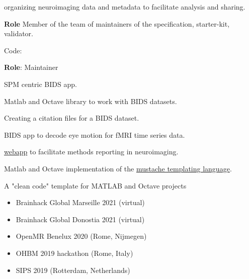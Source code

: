 
 organizing neuroimaging data and metadata to facilitate analysis and sharing.

\textbf{Role} Member of the team of maintainers of the specification, starter-kit, validator.

\textbullet Code: 

\vspace{5mm}


\textbf{Role}: Maintainer

 SPM centric BIDS app. 

 Matlab and Octave library to work with BIDS datasets. 

 Creating a citation files for a BIDS dataset. 

 BIDS app to decode eye motion for fMRI time series data. 

 \href{https://ohbm.github.io/cobidas/}{webapp} 
to facilitate methods reporting in neuroimaging. 

 Matlab and Octave implementation 
of the \href{https://mustache.github.io/}{mustache templating language}.  

 A "clean code" template for MATLAB and Octave projects 

\vspace{5mm}



\begin{itemize}
    \item Brainhack Global Marseille 2021 (virtual) 
    \item Brainhack Global Donostia 2021 (virtual) 
    \item OpenMR Benelux 2020 (Rome, Nijmegen) 
    \item OHBM 2019 hackathon (Rome, Italy) 
\end{itemize}

\begin{itemize}
    \item SIPS 2019 (Rotterdam, Netherlands)
\end{itemize}
